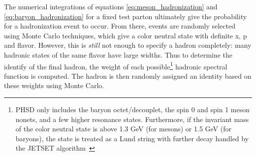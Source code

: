 The numerical integrations of equations \ref{eq:meson_hadronization} and \ref{eq:baryon_hadronization} for a fixed test parton ultimately give the probability for a hadronization event to occur. From there, events are randomly selected using Monte Carlo techniques, which give a color neutral state with definite x, p and flavor. However, this is \textit{still} not enough to specify a hadron completely: many hadronic states of the same flavor have large widths. Thus to determine the identify of the final hadron, the weight of each possible\footnote{PHSD only includes the baryon octet/decouplet, the spin 0 and spin 1 meson nonets, and a few higher resonance states. Furthermore, if the invariant mass of the color neutral state is above 1.3 GeV (for mesons) or 1.5 GeV (for baryons), the state is treated as a Lund string with further decay handled by the JETSET algorithm~\cite{JETSET}} hadronic spectral function is computed. The hadron is then randomly assigned an identity based on these weights using Monte Carlo.

